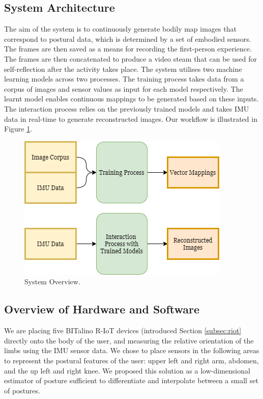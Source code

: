 \subsection*{System Architecture}

The aim of the system is to continuously generate bodily map images that correspond to postural data, which is determined by a set of embodied sensors. The frames are then saved as a means for recording the first-person experience. The frames are then concatenated to produce a video steam that can be used for self-reflection after the activity takes place. The system utilises two machine learning models across two processes. The training process takes data from a corpus of images and sensor values as input for each model respectively. The learnt model enables continuous mappings to be generated based on these inputs. The interaction process relies on the previously trained models and takes IMU data in real-time to generate reconstructed images. Our workflow is illustrated in Figure \ref{fig:system_overview}.

\begin{figure}[ht]
    \centering
    \includegraphics[width=\textwidth]{Chapters/Figures/modi_dis/Latent-Steps-Architecture.png}
    \caption{System Overview.}
    \label{fig:system_overview}
\end{figure}

\subsection*{Overview of Hardware and Software}

We are placing five BITalino R-IoT devices (introduced Section \ref{subsec:riot} directly onto the body of the user, and measuring the relative orientation of the limbs using the IMU sensor data. We chose to place sensors in the following areas to represent the postural features of the user: upper left and right arm, abdomen, and the up left and right knee. We proposed this solution as a low-dimensional estimator of posture sufficient to differentiate and interpolate between a small set of postures.

